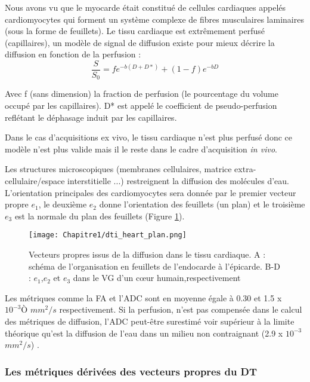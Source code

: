 Nous avons vu que le myocarde était constitué de cellules cardiaques appelés cardiomyocytes qui forment un système complexe de fibres musculaires laminaires (sous la forme de feuillets). Le tissu cardiaque est extrêmement perfusé (capillaires), un modèle de signal de diffusion existe pour mieux décrire la diffusion en fonction de la perfusion \cite{NiellesVallespin2019} :
\begin{equation}
\nonumber
\frac{S}{S_0}=fe^{-b\left(D+D\ast\right)}+\left(1-f\right)e^{-bD}
\end{equation}

Avec f (sans dimension) la fraction de perfusion (le pourcentage du volume occupé par les capillaires). D* est appelé le coefficient de pseudo-perfusion reflétant le déphasage induit par les capillaires.

Dans le cas d’acquisitions ex vivo, le tissu cardiaque n’est plus perfusé donc ce modèle n’est plus valide mais il le reste dans le cadre d’acquisition \textit{in vivo}.

Les structures microscopiques (membranes cellulaires, matrice extra-cellulaire/espace interstitielle ...) restreignent la diffusion des molécules d’eau. L’orientation principales des cardiomyocytes sera donnée par le premier vecteur propre $e_1$, le deuxième $e_2$ donne l’orientation des feuillets (un plan) et le troisième $e_3$ est la normale du plan des feuillets (Figure \ref{fig:dti_heart_plan}).

\begin{figure}[!h]
\begin{center}
  \texttt{[image: Chapitre1/dti\_heart\_plan.png]}
   \end{center}
  \caption{Vecteurs propres issus de la diffusion dans le tissu cardiaque. A : schéma de l’organisation en feuillets de l’endocarde à l’épicarde. B-D : $e_1$,$e_2$ et $e_3$ dans le VG d’un cœur humain,respectivement}
\label{fig:dti_heart_plan}
\end{figure}

Les métriques comme la FA et l’ADC sont en moyenne égale à 0.30 et 1.5 x $10^{-3}Ò$ $mm^2/s$ respectivement. Si la perfusion, n’est pas compensée dans le calcul des métriques de diffusion, l’ADC peut-être surestimé voir supérieur à la limite théorique qu’est la diffusion de l’eau dans un milieu non contraignant (2.9 x $10^{-3}$ $mm^2/s$) \cite{Moulin2023}.

\subsubsection{Les métriques dérivées des vecteurs propres du DT}


